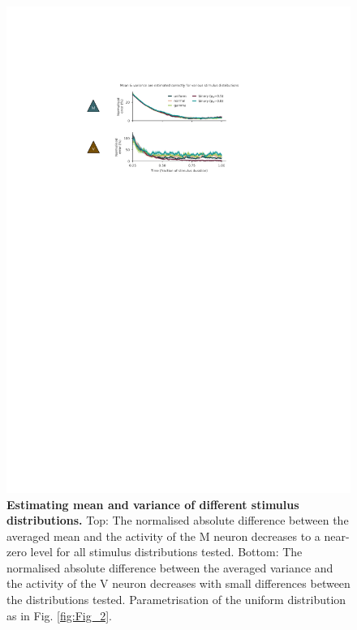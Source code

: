 \documentclass[10pt,a4paper]{article}
\begin{document}
\begin{figure}[!h]
	\centering
    \includegraphics{../results/figures/final/Fig_2_S1.pdf}%
\caption{\footnotesize{\bf Estimating mean and variance of different stimulus distributions.\newline}  
Top: The normalised absolute difference between the averaged mean and the activity of the M neuron decreases to a near-zero level for all stimulus distributions tested. 
Bottom: The normalised absolute difference between the averaged variance and the activity of the V neuron decreases with small differences between the distributions tested. Parametrisation of the uniform distribution as in Fig. \ref{fig:Fig_2}. 
}
\label{fig:Fig_2_S1}
\end{figure}
\end{document}
